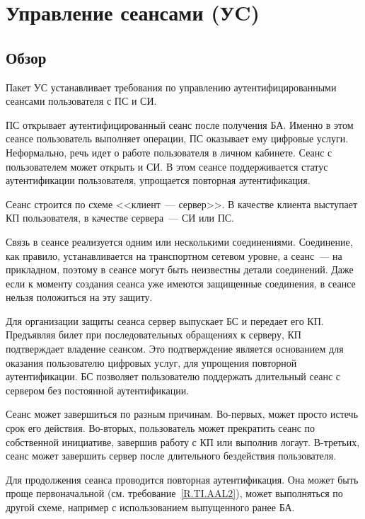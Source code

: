 \section{Управление сеансами (УC)}\label{SM}

\subsection{Обзор}\label{SM.Intro}

Пакет УС устанавливает требования по управлению аутентифицированными сеансами 
пользователя с ПС и СИ.

ПС открывает аутентифицированный сеанс после получения БА. Именно в этом сеансе 
пользователь выполняет операции, ПС оказывает ему цифровые услуги. Неформально, 
речь идет о работе пользователя в личном кабинете.
%
Сеанс с пользователем может открыть и СИ. В этом сеансе поддерживается статус
аутентификации пользователя, упрощается повторная аутентификация.

Сеанс строится по схеме <<клиент~--- сервер>>. В качестве клиента выступает КП
пользователя, в качестве сервера~--- СИ или ПС.

Связь в сеансе реализуется одним или несколькими соединениями. 
%
Соединение, как правило, устанавливается на транспортном 
сетевом уровне, а сеанс~--- на прикладном, поэтому в сеансе могут
быть неизвестны детали соединений.
%
Даже если к моменту создания сеанса уже имеются защищенные соединения,
в сеансе нельзя положиться на эту защиту.

Для организации защиты сеанса сервер выпускает БС и передает его КП. 
Предъявляя билет при последовательных обращениях к серверу,
КП подтверждает владение сеансом. Это подтверждение является основанием
для оказания пользователю цифровых услуг, для упрощения повторной 
аутентификации. БС позволяет пользователю поддержать длительный 
сеанс с сервером без постоянной аутентификации.  

Сеанс может завершиться по разным причинам. Во-первых, может просто истечь
срок его действия. Во-вторых, пользователь может прекратить сеанс по 
собственной инициативе, завершив работу с КП или выполнив логаут. В-третьих, 
сеанс может завершить сервер после длительного бездействия пользователя. 

Для продолжения сеанса проводится повторная аутентификация.
%
Она может быть проще первоначальной (см. требование~\ref{R.TI.AAL2}), 
может выполняться по другой схеме, например с использованием выпущенного 
ранее БА. 

